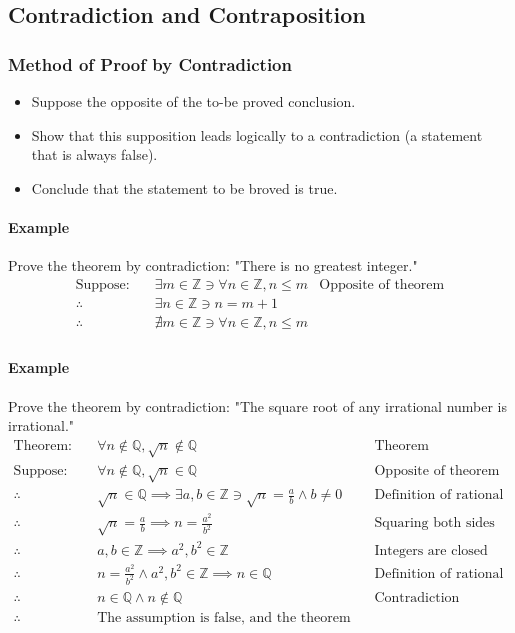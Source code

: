 \subsection{Contradiction and Contraposition}
\hrulefill

\subsubsection*{Method of Proof by Contradiction}
\begin{itemize}
    \item Suppose the opposite of the to-be proved conclusion.
    \item Show that this supposition leads logically to a contradiction (a statement that is always false).
    \item Conclude that the statement to be broved is true.
\end{itemize}

\paragraph*{Example}
Prove the theorem by contradiction: "There is no greatest integer."
\begin{align*}
    \text{Suppose:} \quad & \exists m \in \mathbb{Z} \ni \forall n \in \mathbb{Z}, n \leq m & \text{Opposite of theorem}\\
    \therefore \quad & \exists n \in \mathbb{Z} \ni n = m + 1\\
    \therefore \quad & \nexists m \in \mathbb{Z} \ni \forall n \in \mathbb{Z}, n \leq m\\
\end{align*}

\paragraph*{Example}
Prove the theorem by contradiction: "The square root of any irrational number is irrational."
\begin{align*}
    \text{Theorem:} \quad & \forall n \notin \mathbb{Q}, \sqrt{n} \notin \mathbb{Q} & \text{Theorem}\\
    \text{Suppose:} \quad & \forall n \notin \mathbb{Q}, \sqrt{n} \in \mathbb{Q} & \text{Opposite of theorem}\\ 
    \therefore \quad & \sqrt{n} \in \mathbb{Q} \implies \exists a, b \in \mathbb{Z} \ni \sqrt{n} = \frac{a}{b} \land b \neq 0 & \text{Definition of rational numbers}\\
    \therefore \quad & \sqrt{n} = \frac{a}{b} \implies n = \frac{a^2}{b^2} & \text{Squaring both sides}\\
    \therefore \quad & a, b \in \mathbb{Z} \implies a^2, b^2 \in \mathbb{Z} & \text{Integers are closed under squaring}\\
    \therefore \quad & n = \frac{a^2}{b^2} \land a^2, b^2 \in \mathbb{Z} \implies n \in \mathbb{Q} & \text{Definition of rational numbers}\\
    \therefore \quad & n \in \mathbb{Q} \land n \notin \mathbb{Q} & \text{Contradiction}\\
    \therefore \quad & \text{The assumption is false, and the theorem is true.}
\end{align*}

